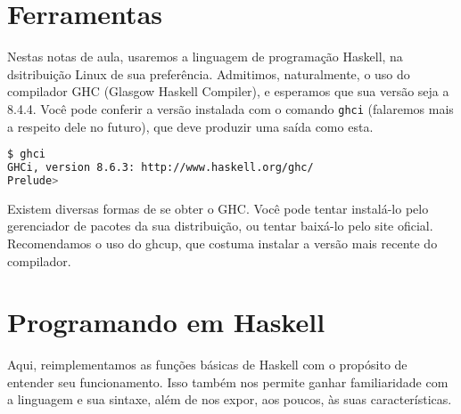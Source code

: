 \documentclass[a4paper]{article}
\begin{document}
\section{Ferramentas}

Nestas notas de aula, usaremos a linguagem de programação Haskell, na dsitribuição Linux de sua preferência.
Admitimos, naturalmente, o uso do compilador GHC (Glasgow Haskell Compiler), e esperamos que sua versão
seja a 8.4.4.
Você pode conferir a versão instalada com o comando \texttt{ghci} (falaremos mais a respeito dele no futuro), que deve
produzir uma saída como esta.

\begin{lstlisting}[language=bash, frame=single]
$ ghci
GHCi, version 8.6.3: http://www.haskell.org/ghc/
Prelude> 
\end{lstlisting}

Existem diversas formas de se obter o GHC.
Você pode tentar instalá-lo pelo gerenciador de pacotes da sua distribuição, ou tentar baixá-lo pelo site oficial.
Recomendamos o uso do ghcup, que costuma instalar a versão mais recente do compilador.

\section{Programando em Haskell}

Aqui, reimplementamos as funções básicas de Haskell com o propósito de entender seu funcionamento.
Isso também nos permite ganhar familiaridade com a linguagem e sua sintaxe, além de nos expor, aos poucos, às suas características.
\end{document}
